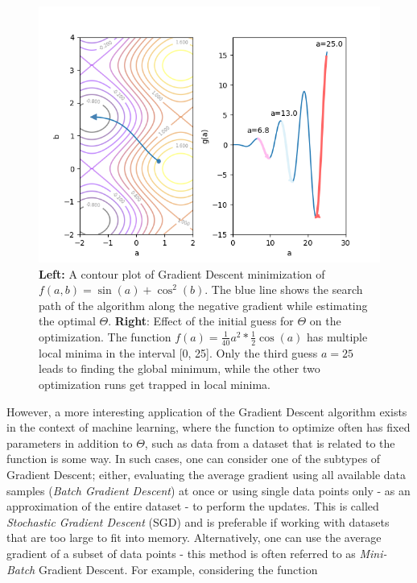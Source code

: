 \begin {figure}[!ht]
	\begin{center}
		\includegraphics[scale=0.9]{img/fig_grad_desc}
	\end{center}
	\caption{\textbf{Left:} A contour plot of Gradient Descent minimization of $f(a, b) = \sin(a) + \cos^2(b)$. The blue line shows the search path of the algorithm along the negative gradient while estimating the optimal $\Theta$. \textbf{Right}: Effect of the initial guess for $\Theta$ on the optimization. The function $f(a) = \frac{1}{40}a^2 * \frac{1}{2} \cos(a)$ has multiple local minima in the interval [0, 25]. Only the third guess $a=25$ leads to finding the global minimum, while the other two optimization runs get trapped in local minima.}
	\label{fig:grad_desc}
\end {figure}

\noindent However, a more interesting application of the Gradient Descent algorithm exists in the context of machine learning, where the function to optimize often has fixed parameters in addition to $\Theta$, such as data from a dataset that is related to the function is some way. In such cases, one can consider one of the subtypes of Gradient Descent; either, evaluating the average gradient using all available data samples (\textit{Batch Gradient Descent}) at once or using single data points only - as an approximation of the entire dataset - to perform the updates. This is called \textit{Stochastic Gradient Descent} (SGD) and is preferable if working with datasets that are too large to fit into memory. Alternatively, one can use the average gradient of a subset of data points - this method is often referred to as \textit{Mini-Batch} Gradient Descent. For example, considering the function

